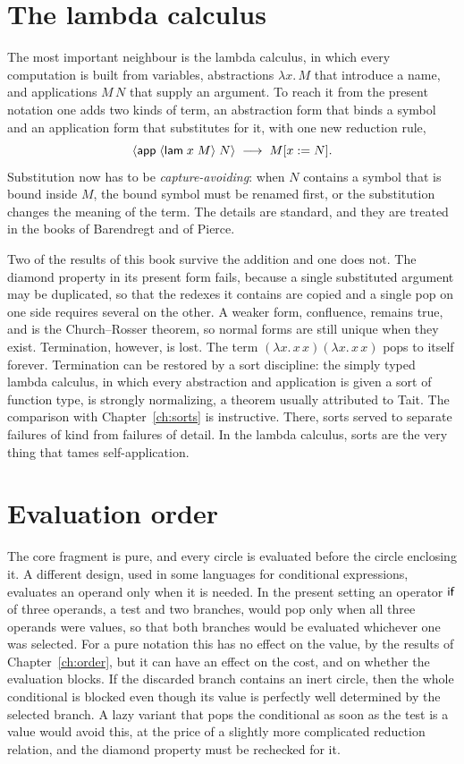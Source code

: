\section{The lambda calculus}

The most important neighbour is the lambda calculus, in which every computation is built from variables, abstractions $\lambda x.\,M$ that introduce a name, and applications $M\,N$ that supply an argument. To reach it from the present notation one adds two kinds of term, an abstraction form that binds a symbol and an application form that substitutes for it, with one new reduction rule,
\[
\langle \mathsf{app}\; \langle \mathsf{lam}\; x\; M\rangle\; N\rangle\;\longrightarrow\; M[x:=N].
\]
Substitution now has to be \emph{capture-avoiding}: when $N$ contains a symbol that is bound inside $M$, the bound symbol must be renamed first, or the substitution changes the meaning of the term. The details are standard, and they are treated in the books of Barendregt and of Pierce.

Two of the results of this book survive the addition and one does not. The diamond property in its present form fails, because a single substituted argument may be duplicated, so that the redexes it contains are copied and a single pop on one side requires several on the other. A weaker form, confluence, remains true, and is the Church--Rosser theorem, so normal forms are still unique when they exist. Termination, however, is lost. The term $(\lambda x.\,x\,x)(\lambda x.\,x\,x)$ pops to itself forever. Termination can be restored by a sort discipline: the simply typed lambda calculus, in which every abstraction and application is given a sort of function type, is strongly normalizing, a theorem usually attributed to Tait. The comparison with Chapter~\ref{ch:sorts} is instructive. There, sorts served to separate failures of kind from failures of detail. In the lambda calculus, sorts are the very thing that tames self-application.

\section{Evaluation order}

The core fragment is pure, and every circle is evaluated before the circle enclosing it. A different design, used in some languages for conditional expressions, evaluates an operand only when it is needed. In the present setting an operator $\mathsf{if}$ of three operands, a test and two branches, would pop only when all three operands were values, so that both branches would be evaluated whichever one was selected. For a pure notation this has no effect on the value, by the results of Chapter~\ref{ch:order}, but it can have an effect on the cost, and on whether the evaluation blocks. If the discarded branch contains an inert circle, then the whole conditional is blocked even though its value is perfectly well determined by the selected branch. A lazy variant that pops the conditional as soon as the test is a value would avoid this, at the price of a slightly more complicated reduction relation, and the diamond property must be rechecked for it.

